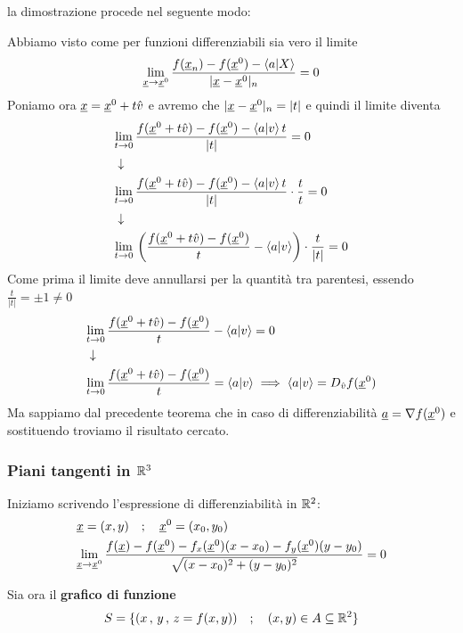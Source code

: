 \begin{enumerate}
	\bigskip
	la dimostrazione procede nel seguente modo:
	
	Abbiamo visto come per funzioni differenziabili sia vero il limite
	\begin{align}
	\underset{\underline{x} \rightarrow \underline{x}^0}{\lim} \,\frac{f(\underline{x}_n) - f(\underline{x}^0) - \braket{a|X}}{|\underline{x} - \underline{x}^0|_n}  = 0
	\end{align}
	Poniamo ora $\underline{x}=\underline{x}^0 + t\hat{v}$ e avremo che $|\underline{x} - \underline{x}^0|_n=|t|$ e quindi il limite diventa
	\begin{align}
	&\underset{t \rightarrow 0}{\lim} \, \frac{f(\underline{x}^0 + t\hat{v}) - f(\underline{x}^0 ) - \braket{a|v}t}{|t|}=0 \nonumber \\ &\downarrow \nonumber \\
	&\underset{t \rightarrow 0}{\lim} \, \frac{f(\underline{x}^0 + t\hat{v}) - f(\underline{x}^0 ) - \braket{a|v}t}{|t|} \cdot \frac{t}{t}=0 \nonumber \\ &\downarrow \nonumber \\
	&\underset{t \rightarrow 0}{\lim} \, \left(\frac{f(\underline{x}^0 + t\hat{v}) - f(\underline{x}^0 )}{t} - \braket{a|v} \right) \cdot \frac{t}{|t|}=0
	\end{align}
	Come prima il limite deve annullarsi per la quantità tra parentesi, essendo $\frac{t}{|t|}= \pm 1 \neq 0$ 
	\begin{align}
	&\underset{t \rightarrow 0}{\lim} \, \frac{f(\underline{x}^0 + t\hat{v}) - f(\underline{x}^0 )}{t} - \braket{a|v} =0 \nonumber \\ &\downarrow \nonumber \\
	& \underset{t \rightarrow 0}{\lim} \, \frac{f(\underline{x}^0 + t\hat{v}) - f(\underline{x}^0 )}{t} = \braket{a|v} \implies \braket{a|v} = D_{\hat v} f(\underline{x}^0)
	\end{align}
	Ma sappiamo dal precedente teorema che in caso di differenziabilità $\underline{a}=\nabla f(\underline{x}^0)$ e sostituendo troviamo il risultato cercato.
	
\end{enumerate}

\newpage

\subsubsection{Piani tangenti in $\mathbb{R}^3$}

Iniziamo scrivendo l'espressione di differenziabilità in $\mathbb{R}^2$:
\begin{align}
{}& \underline{x}=(x,y) \quad ; \quad \underline{x}^0=(x_0,y_0) \\
&\underset{\underline{x} \rightarrow \underline{x}^0}{\lim} \, \frac{f(\underline{x}) - f(\underline{x}^0) - f_x(\underline{x}^0)(x-x_0) - f_y(\underline{x}^0)(y-y_0)}{\sqrt{(x-x_0)^2 + (y-y_0)^2}}=0
\end{align}

\bigskip

Sia ora il \textbf{grafico di funzione}
\begin{align}
S=\{  (x \, , \, y \, , \, z=f(x,y)) \quad ; \quad (x,y)\in A \subseteq \mathbb{R}^2 \}
\end{align}

